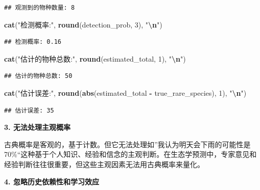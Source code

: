\documentclass[
  twoside]{book}
\newenvironment{Shaded}{\begin{snugshade}}{\end{snugshade}}
\newcommand{\DecValTok}[1]{\textcolor[rgb]{0.00,0.00,0.81}{#1}}
\newcommand{\FunctionTok}[1]{\textcolor[rgb]{0.13,0.29,0.53}{\textbf{#1}}}
\newcommand{\NormalTok}[1]{#1}
\newcommand{\SpecialCharTok}[1]{\textcolor[rgb]{0.81,0.36,0.00}{\textbf{#1}}}
\newcommand{\StringTok}[1]{\textcolor[rgb]{0.31,0.60,0.02}{#1}}
\begin{document}
\begin{verbatim}
## 观测到的物种数量: 8
\end{verbatim}

\begin{Shaded}
\begin{Highlighting}[]
\FunctionTok{cat}\NormalTok{(}\StringTok{"检测概率:"}\NormalTok{, }\FunctionTok{round}\NormalTok{(detection\_prob, }\DecValTok{3}\NormalTok{), }\StringTok{"}\SpecialCharTok{\textbackslash{}n}\StringTok{"}\NormalTok{)}
\end{Highlighting}
\end{Shaded}

\begin{verbatim}
## 检测概率: 0.16
\end{verbatim}

\begin{Shaded}
\begin{Highlighting}[]
\FunctionTok{cat}\NormalTok{(}\StringTok{"估计的物种总数:"}\NormalTok{, }\FunctionTok{round}\NormalTok{(estimated\_total, }\DecValTok{1}\NormalTok{), }\StringTok{"}\SpecialCharTok{\textbackslash{}n}\StringTok{"}\NormalTok{)}
\end{Highlighting}
\end{Shaded}

\begin{verbatim}
## 估计的物种总数: 50
\end{verbatim}

\begin{Shaded}
\begin{Highlighting}[]
\FunctionTok{cat}\NormalTok{(}\StringTok{"估计误差:"}\NormalTok{, }\FunctionTok{round}\NormalTok{(}\FunctionTok{abs}\NormalTok{(estimated\_total }\SpecialCharTok{{-}}\NormalTok{ true\_rare\_species), }\DecValTok{1}\NormalTok{), }\StringTok{"}\SpecialCharTok{\textbackslash{}n}\StringTok{"}\NormalTok{)}
\end{Highlighting}
\end{Shaded}

\begin{verbatim}
## 估计误差: 35
\end{verbatim}

\textbf{3. 无法处理主观概率}

古典概率是客观的，基于计数。但它无法处理如''我认为明天会下雨的可能性是70\%``这种基于个人知识、经验和信念的主观判断。在生态学预测中，专家意见和经验判断往往很重要，但这些主观因素无法用古典概率来量化。

\textbf{4. 忽略历史依赖性和学习效应}
\end{document}
